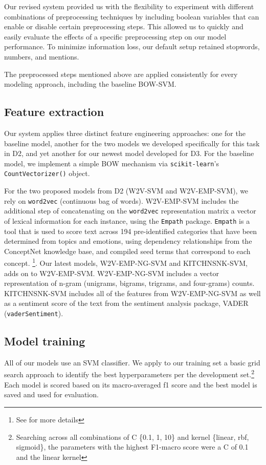 \documentclass[11pt,a4paper]{article}
\begin{document}
Our revised system provided us with the flexibility to experiment with different combinations of preprocessing techniques by including boolean variables that can enable or disable certain preprocessing steps. This allowed us to quickly and easily evaluate the effects of a specific preprocessing step on our model performance. To minimize information loss, our default setup retained stopwords, numbers, and mentions.

The preprocessed steps mentioned above are applied consistently for every modeling approach, including the baseline BOW-SVM.



\subsection{Feature extraction}
Our system applies three distinct feature engineering approaches: one for the baseline model, another for the two models we developed specifically for this task in D2, and yet another for our newest model developed for D3. For the baseline model, we implement a simple BOW mechanism via \verb|scikit-learn|’s \verb|CountVectorizer()| object.

For the two proposed models from D2 (W2V-SVM and W2V-EMP-SVM), we rely on \verb|word2vec| (continuous bag of words). W2V-EMP-SVM includes the additional step of concatenating on the \verb|word2vec| representation matrix a vector of lexical information for each instance, using the \verb|Empath| package. \verb|Empath| is a tool that is used to score text across 194 pre-identified categories that have been determined from topics and emotions, using dependency relationships from the ConceptNet knowledge base, and compiled seed terms that correspond to each concept. \footnote{See \citet{fast2016empath} for more details}. Our latest models, W2V-EMP-NG-SVM and KITCHNSNK-SVM, adds on to W2V-EMP-SVM. W2V-EMP-NG-SVM includes a vector representation of n-gram (unigrams, bigrams, trigrams, and four-grams) counts. KITCHNSNK-SVM includes all of the features from W2V-EMP-NG-SVM as well as a sentiment score of the text from the sentiment analysis package, VADER (\verb|vaderSentiment|).





\subsection{Model training}
All of our models use an SVM classifier. We apply to our training set a basic grid search approach to identify the best hyperparameters per the development set.\footnote{Searching across all combinations of C \{0.1, 1, 10\} and kernel \{linear, rbf, sigmoid\}, the parameters with the highest F1-macro score were a C of 0.1 and the linear kernel} Each model is scored based on its macro-averaged f1 score and the best model is saved and used for evaluation.
\end{document}
